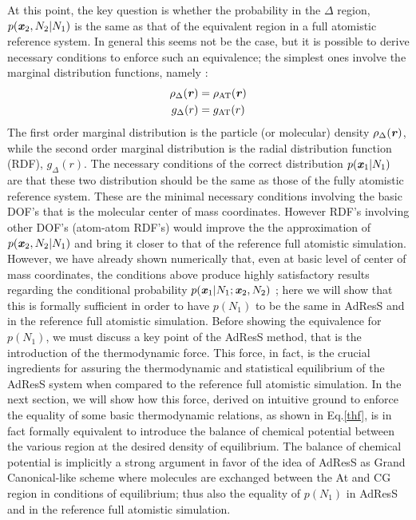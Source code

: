 \documentclass[aip,jcp,a4paper,reprint,onecolumn]{revtex4-1}
\newcommand{\vect}[1]{\textbf{\textit{#1}}}
\newcommand{\AT}{{\textrm{{AT}}}}
\newcommand{\HY}{{\Delta}}
\begin{document}
\noindent
At this point, the key question is whether the probability in the $\HY$ region, $p(\vect
x_2, N_2 | N_1)$ is the same as that of the equivalent region in a full atomistic reference
system. In general this seems not be the case, but it is possible to
derive necessary conditions to enforce such an equivalence; the simplest ones involve
the marginal distribution functions, namely \cite{rdfcorr}:
\begin{align}
  \rho_{\HY}(\vect r) &= \rho_{\AT}(\vect r)\\
  g_{\HY}( r) &= g_{\AT}(r)
\end{align}
The first order marginal distribution is the particle (or molecular) density 
$\rho_{\HY}(\vect r)$, while the second order marginal distribution is
the radial distribution function (RDF), $g_{\HY}(r)$. The necessary
conditions of the correct distribution $p(\vect x_1|N_1)$
are that these two distribution should be the same as those of the fully atomistic reference system. 
These are the minimal necessary conditions involving the basic DOF's that is the molecular center of mass coordinates. However RDF's involving other DOF's (atom-atom RDF's)
would improve the the approximation of $p(\vect
x_2, N_2 | N_1)$ and bring it closer to that of the reference full atomistic simulation.
However, we have already shown numerically that, even at basic level of center of mass coordinates, the conditions above produce highly satisfactory results regarding the conditional probability $p(\vect x_1 | N_1; \vect x_2, N_2)$  \cite{rdfcorr}; here we will show that this is formally sufficient in order to have $p(N_{1})$ to be the same in AdResS and in the reference full atomistic simulation. Before showing the equivalence for  $p(N_{1})$, we must discuss a key point of the AdResS method, that is the introduction of the thermodynamic force. This force, in fact, is the crucial ingredients for assuring the thermodynamic and statistical equilibrium of the AdResS system when compared to the reference full atomistic simulation. In the next section, we will show how this force, derived on intuitive ground to enforce the equality of some basic thermodynamic relations, as shown in Eq.\ref{thf}, is in fact formally equivalent to introduce the balance of chemical potential between the various region at the desired density of equilibrium. The balance of chemical potential is implicitly a strong argument in favor of the idea of AdResS as Grand Canonical-like scheme where molecules are exchanged between the At and CG region in conditions of equilibrium; thus also the equality of $p(N_{1})$ in AdResS and in the reference full atomistic simulation. 
\end{document}
